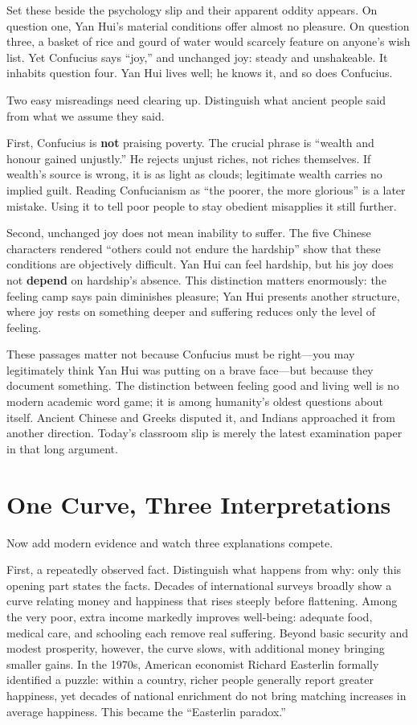 Set these beside the psychology slip and their apparent oddity appears. On question one, Yan Hui's material conditions offer almost no pleasure. On question three, a basket of rice and gourd of water would scarcely feature on anyone's wish list. Yet Confucius says ``joy,'' and unchanged joy: steady and unshakeable. It inhabits question four. Yan Hui lives well; he knows it, and so does Confucius.

Two easy misreadings need clearing up. Distinguish what ancient people said from what we assume they said.

First, Confucius is \textbf{not} praising poverty. The crucial phrase is ``wealth and honour gained unjustly.'' He rejects unjust riches, not riches themselves. If wealth's source is wrong, it is as light as clouds; legitimate wealth carries no implied guilt. Reading Confucianism as ``the poorer, the more glorious'' is a later mistake. Using it to tell poor people to stay obedient misapplies it still further.

Second, unchanged joy does not mean inability to suffer. The five Chinese characters rendered ``others could not endure the hardship'' show that these conditions are objectively difficult. Yan Hui can feel hardship, but his joy does not \textbf{depend} on hardship's absence. This distinction matters enormously: the feeling camp says pain diminishes pleasure; Yan Hui presents another structure, where joy rests on something deeper and suffering reduces only the level of feeling.

These passages matter not because Confucius must be right---you may legitimately think Yan Hui was putting on a brave face---but because they document something. The distinction between feeling good and living well is no modern academic word game; it is among humanity's oldest questions about itself. Ancient Chinese and Greeks disputed it, and Indians approached it from another direction. Today's classroom slip is merely the latest examination paper in that long argument.

\section{One Curve, Three Interpretations}
Now add modern evidence and watch three explanations compete.

First, a repeatedly observed fact. Distinguish what happens from why: only this opening part states the facts. Decades of international surveys broadly show a curve relating money and happiness that rises steeply before flattening. Among the very poor, extra income markedly improves well-being: adequate food, medical care, and schooling each remove real suffering. Beyond basic security and modest prosperity, however, the curve slows, with additional money bringing smaller gains. In the 1970s, American economist Richard Easterlin formally identified a puzzle: within a country, richer people generally report greater happiness, yet decades of national enrichment do not bring matching increases in average happiness. This became the ``Easterlin paradox.''


